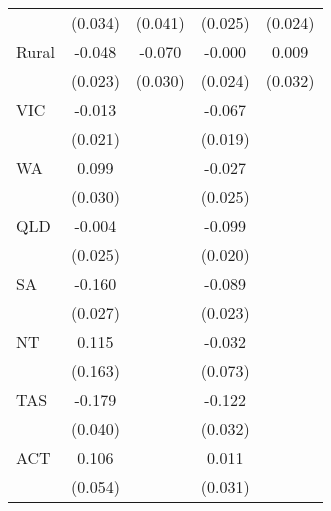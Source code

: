 {\begin{tabular}{l*{4}{c}}
                    &     (0.034)         &     (0.041)         &     (0.025)         &     (0.024)         \\
[1em]
Rural               &      -0.048\sym{*}  &      -0.070\sym{*}  &      -0.000         &       0.009         \\
                    &     (0.023)         &     (0.030)         &     (0.024)         &     (0.032)         \\
[1em]
VIC                 &      -0.013         &                     &      -0.067\sym{***}&                     \\
                    &     (0.021)         &                     &     (0.019)         &                     \\
[1em]
WA                  &       0.099\sym{***}&                     &      -0.027         &                     \\
                    &     (0.030)         &                     &     (0.025)         &                     \\
[1em]
QLD                 &      -0.004         &                     &      -0.099\sym{***}&                     \\
                    &     (0.025)         &                     &     (0.020)         &                     \\
[1em]
SA                  &      -0.160\sym{***}&                     &      -0.089\sym{***}&                     \\
                    &     (0.027)         &                     &     (0.023)         &                     \\
[1em]
NT                  &       0.115         &                     &      -0.032         &                     \\
                    &     (0.163)         &                     &     (0.073)         &                     \\
[1em]
TAS                 &      -0.179\sym{***}&                     &      -0.122\sym{***}&                     \\
                    &     (0.040)         &                     &     (0.032)         &                     \\
[1em]
ACT                 &       0.106         &                     &       0.011         &                     \\
                    &     (0.054)         &                     &     (0.031)         &                     \\

\end{tabular}}
